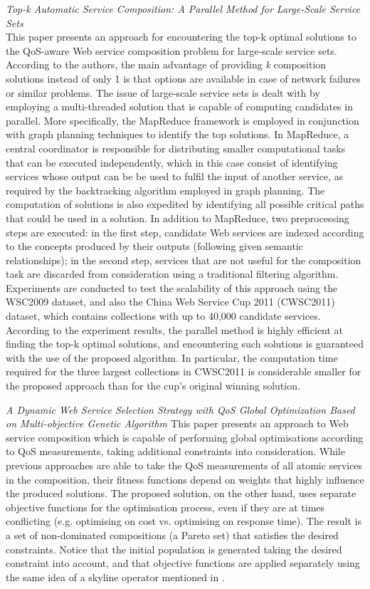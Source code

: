\textit{Top-k Automatic Service Composition: A Parallel Method for Large-Scale Service Sets \cite{deng2014top}}\\
This paper presents an approach for encountering the top-k optimal solutions to the QoS-aware Web service composition problem for large-scale service sets. According to the authors, the main advantage of providing \textit{k} composition solutions instead of only 1 is that options are available in case of network failures or similar problems. The issue of large-scale service sets is dealt with by employing a multi-threaded solution that is capable of computing candidates in parallel. More specifically, the MapReduce framework is employed in conjunction with graph planning techniques to identify the top solutions. In MapReduce, a central coordinator is responsible for distributing smaller computational tasks that can be executed independently, which in this case consist of identifying services whose output can be be used to fulfil the input of another service, as required by the backtracking algorithm employed in graph planning. The computation of solutions is also expedited by identifying all possible critical paths that could be used in a solution. In addition to MapReduce, two preprocessing steps are executed: in the first step, candidate Web services are indexed according to the concepts produced by their outputs (following given semantic relationships); in the second step, services that are not useful for the composition task are discarded from consideration using a traditional filtering algorithm. Experiments are conducted to test the scalability of this approach using the WSC2009 dataset, and also the China Web Service Cup 2011 (CWSC2011) dataset, which contains collections with up to 40,000 candidate services. According to the experiment results, the parallel method is highly efficient at finding the top-k optimal solutions, and encountering such solutions is guaranteed with the use of the proposed algorithm. In particular, the computation time required for the three largest collections in CWSC2011 is considerable smaller for the proposed approach than for the cup's original winning solution.

\textit{A Dynamic Web Service Selection Strategy with QoS Global Optimization Based on Multi-objective Genetic Algorithm \cite{liu2005dynamic}}
This paper presents an approach to Web service composition which is capable of performing global optimisations according
to QoS measurements, taking additional constraints into consideration. While previous approaches are able to take the
QoS measurements of all atomic services in the composition, their fitness functions depend on weights that highly influence
the produced solutions. The proposed solution, on the other hand, uses separate objective functions for the optimisation process,
even if they are at times conflicting (e.g. optimising on cost vs. optimising on response time). The result is a set of
non-dominated compositions (a Pareto set) that satisfies the desired constraints. Notice that the initial population is
generated taking the desired constraint into account, and that objective functions are applied separately using the same
idea of a skyline operator mentioned in \cite{wang2013particle}.


